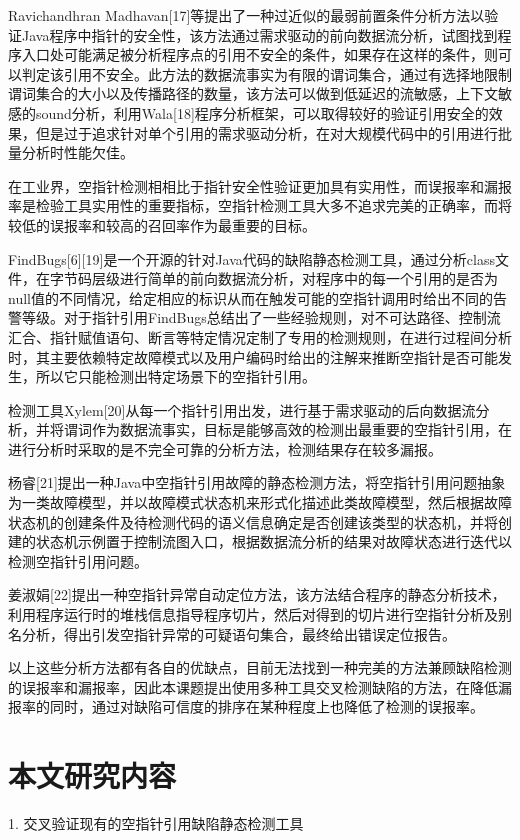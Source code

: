 Ravichandhran Madhavan[17]等提出了一种过近似的最弱前置条件分析方法以验证Java程序中指针的安全性，该方法通过需求驱动的前向数据流分析，试图找到程序入口处可能满足被分析程序点的引用不安全的条件，如果存在这样的条件，则可以判定该引用不安全。此方法的数据流事实为有限的谓词集合，通过有选择地限制谓词集合的大小以及传播路径的数量，该方法可以做到低延迟的流敏感，上下文敏感的sound分析，利用Wala[18]程序分析框架，可以取得较好的验证引用安全的效果，但是过于追求针对单个引用的需求驱动分析，在对大规模代码中的引用进行批量分析时性能欠佳。

在工业界，空指针检测相相比于指针安全性验证更加具有实用性，而误报率和漏报率是检验工具实用性的重要指标，空指针检测工具大多不追求完美的正确率，而将较低的误报率和较高的召回率作为最重要的目标。

FindBugs[6][19]是一个开源的针对Java代码的缺陷静态检测工具，通过分析class文件，在字节码层级进行简单的前向数据流分析，对程序中的每一个引用的是否为null值的不同情况，给定相应的标识从而在触发可能的空指针调用时给出不同的告警等级。对于指针引用FindBugs总结出了一些经验规则，对不可达路径、控制流汇合、指针赋值语句、断言等特定情况定制了专用的检测规则，在进行过程间分析时，其主要依赖特定故障模式以及用户编码时给出的注解来推断空指针是否可能发生，所以它只能检测出特定场景下的空指针引用。

检测工具Xylem[20]从每一个指针引用出发，进行基于需求驱动的后向数据流分析，并将谓词作为数据流事实，目标是能够高效的检测出最重要的空指针引用，在进行分析时采取的是不完全可靠的分析方法，检测结果存在较多漏报。

杨睿[21]提出一种Java中空指针引用故障的静态检测方法，将空指针引用问题抽象为一类故障模型，并以故障模式状态机来形式化描述此类故障模型，然后根据故障状态机的创建条件及待检测代码的语义信息确定是否创建该类型的状态机，并将创建的状态机示例置于控制流图入口，根据数据流分析的结果对故障状态进行迭代以检测空指针引用问题。

姜淑娟[22]提出一种空指针异常自动定位方法，该方法结合程序的静态分析技术，利用程序运行时的堆栈信息指导程序切片，然后对得到的切片进行空指针分析及别名分析，得出引发空指针异常的可疑语句集合，最终给出错误定位报告。

以上这些分析方法都有各自的优缺点，目前无法找到一种完美的方法兼顾缺陷检测的误报率和漏报率，因此本课题提出使用多种工具交叉检测缺陷的方法，在降低漏报率的同时，通过对缺陷可信度的排序在某种程度上也降低了检测的误报率。

\section{本文研究内容}
1. 交叉验证现有的空指针引用缺陷静态检测工具

